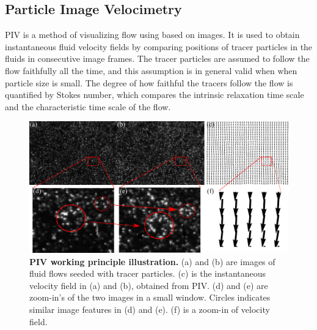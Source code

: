 %
%

\subsection{Particle Image Velocimetry}
PIV is a method of visualizing flow using based on images. It is used to obtain instantaneous fluid velocity fields by comparing positions of tracer particles in the fluids in consecutive image frames. The tracer particles are assumed to follow the flow faithfully all the time, and this assumption is in general valid when when particle size is small. The degree of how faithful the tracers follow the flow is quantified by Stokes number, which compares the intrinsic relaxation time scale and the characteristic time scale of the flow.

\begin{figure}[!htbp]
	\begin{center}
	\includegraphics[width=5.5in]{Figs/2-Exp/PIV.pdf}
	\end{center}
	\caption[PIV Working Principle Illustration]
	{
	\textbf{PIV working principle illustration.}
	(a) and (b) are images of fluid flows seeded with tracer particles. (c) is the instantaneous velocity field in (a) and (b), obtained from PIV. (d) and (e) are zoom-in's of the two images in a small window. Circles indicates similar image features in (d) and (e). (f) is a zoom-in of velocity field.
	}
	\label{fig:PIV}
\end{figure}



